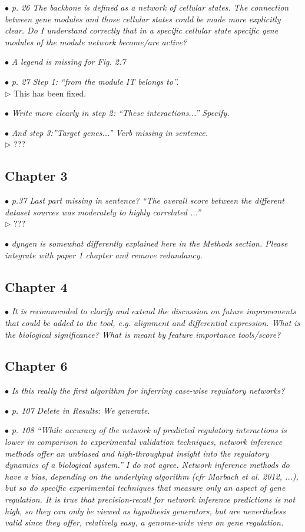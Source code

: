 \documentclass[10pt]{article}
\newcommand{\exam}[2][\  ]{\hspace{0pt}\marginpar{\color{red}#1}$\bullet$ \textit{#2}}
\newcommand{\nimp}[1]{{\color{gray} #1}}
\newcommand{\answ}[1]{{\color{blue} $\triangleright$ #1}}
\newcommand{\bigexclaim}{\raisebox{-0.1em}{\BigTriangleUp}\hspace{-0.32em}\llap{\small\textbf{!}}\hspace{0.32em}}
\newcommand{\tagimp}{\bigexclaim}
\begin{document}
{\exam{p. 26 The backbone is defined as a network of cellular states. The connection between gene
modules and those cellular states could be made more explicitly clear. Do I understand
correctly that in a specific cellular state specific gene modules of the module network
become/are active?}

\exam{A legend is missing for Fig. 2.7}

\exam{p. 27 Step 1: “from the module IT belongs to”.} \\
\answ{This has been fixed.}

\exam{Write more clearly in step 2: “These
interactions...” Specify.}

\exam{And step 3:”Target genes...” Verb missing in sentence.} \\
\answ{???}

\subsection{Chapter 3}

\exam{p.37 Last part missing in sentence? “The overall score between the different dataset sources
	was moderately to highly correlated ...”} \\
\answ{???}

\exam{dyngen is somewhat differently explained here in the Methods section. Please integrate with
	paper 1 chapter and remove redundancy.}

\subsection{Chapter 4}

\exam{It is recommended to clarify and extend the discussion on future improvements that could be
	added to the tool, e.g. alignment and differential expression. What is the biological
	significance? What is meant by feature importance tools/score?}

\subsection{Chapter 6}


\exam{Is this really the first algorithm for inferring case-wise regulatory networks?}

\exam[\tagimp]{p. 107 Delete in Results: We generate.}

\exam{\nimp{p. 108 “While accuracy of the network of predicted regulatory interactions is lower in
	comparison to experimental validation techniques, network inference methods offer an
	unbiased and high-throughput insight into the regulatory dynamics of a biological system.”} I
	do not agree. Network inference methods do have a bias, depending on the underlying
	algorithm (cfr Marbach et al. 2012, ...), but so do specific experimental techniques that
	measure only an aspect of gene regulation. It is true that precision-recall for network
	inference predictions is not high, so they can only be viewed as hypothesis generators, but
	are nevertheless valid since they offer, relatively easy, a genome-wide view on gene
	regulation.}

}
\end{document}

